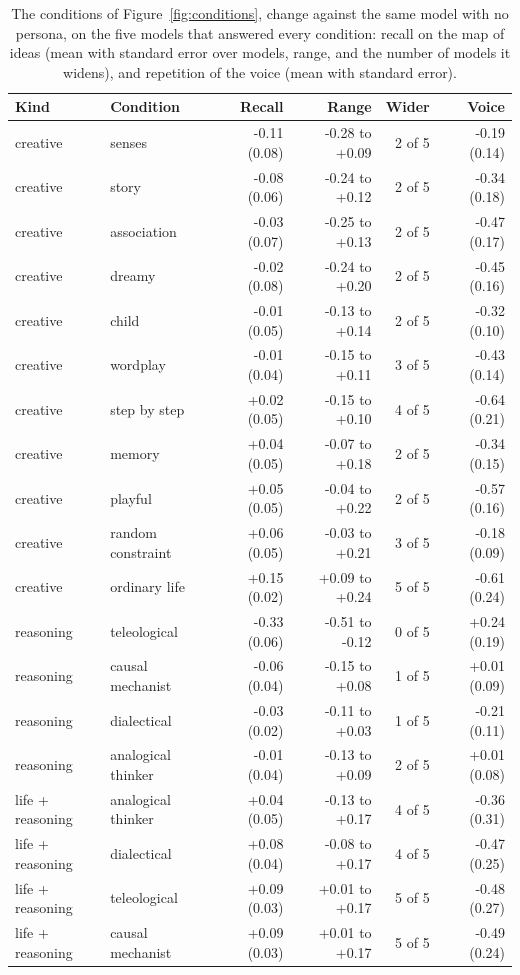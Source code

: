\begin{table}[H]\centering\footnotesize
\caption{The conditions of Figure~\ref{fig:conditions}, change against the same model with no persona, on the five models that answered every condition: recall on the map of ideas (mean with standard error over models, range, and the number of models it widens), and repetition of the voice (mean with standard error).}
\label{tab:conditions}
\begin{tabular}{llrrrr}
\toprule
Kind & Condition & Recall & Range & Wider & Voice\\
\midrule
creative & senses & -0.11 (0.08) & -0.28 to +0.09 & 2 of 5 & -0.19 (0.14)\\
creative & story & -0.08 (0.06) & -0.24 to +0.12 & 2 of 5 & -0.34 (0.18)\\
creative & association & -0.03 (0.07) & -0.25 to +0.13 & 2 of 5 & -0.47 (0.17)\\
creative & dreamy & -0.02 (0.08) & -0.24 to +0.20 & 2 of 5 & -0.45 (0.16)\\
creative & child & -0.01 (0.05) & -0.13 to +0.14 & 2 of 5 & -0.32 (0.10)\\
creative & wordplay & -0.01 (0.04) & -0.15 to +0.11 & 3 of 5 & -0.43 (0.14)\\
creative & step by step & +0.02 (0.05) & -0.15 to +0.10 & 4 of 5 & -0.64 (0.21)\\
creative & memory & +0.04 (0.05) & -0.07 to +0.18 & 2 of 5 & -0.34 (0.15)\\
creative & playful & +0.05 (0.05) & -0.04 to +0.22 & 2 of 5 & -0.57 (0.16)\\
creative & random constraint & +0.06 (0.05) & -0.03 to +0.21 & 3 of 5 & -0.18 (0.09)\\
creative & ordinary life & +0.15 (0.02) & +0.09 to +0.24 & 5 of 5 & -0.61 (0.24)\\
reasoning & teleological & -0.33 (0.06) & -0.51 to -0.12 & 0 of 5 & +0.24 (0.19)\\
reasoning & causal mechanist & -0.06 (0.04) & -0.15 to +0.08 & 1 of 5 & +0.01 (0.09)\\
reasoning & dialectical & -0.03 (0.02) & -0.11 to +0.03 & 1 of 5 & -0.21 (0.11)\\
reasoning & analogical thinker & -0.01 (0.04) & -0.13 to +0.09 & 2 of 5 & +0.01 (0.08)\\
life + reasoning & analogical thinker & +0.04 (0.05) & -0.13 to +0.17 & 4 of 5 & -0.36 (0.31)\\
life + reasoning & dialectical & +0.08 (0.04) & -0.08 to +0.17 & 4 of 5 & -0.47 (0.25)\\
life + reasoning & teleological & +0.09 (0.03) & +0.01 to +0.17 & 5 of 5 & -0.48 (0.27)\\
life + reasoning & causal mechanist & +0.09 (0.03) & +0.01 to +0.17 & 5 of 5 & -0.49 (0.24)\\
\bottomrule
\end{tabular}
\end{table}
